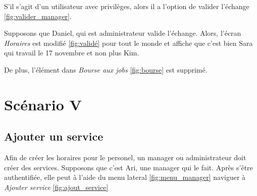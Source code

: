 S'il s'agit d'un utilisateur avec privilèges, alors il a l'option de valider l'échange \ref{fig:valider_manager}. 

Supposons que Daniel, qui est administrateur valide l'échange. Alors, l'écran \textit{Horaires} est modifié \ref{fig:validé}
pour tout le monde et affiche que c'est bien Sara qui travail le 17 novembre et non plus Kim. 

De plus, l'élément dans \textit{Bourse aux jobs} \ref{fig:bourse} est supprimé.

\section[Ajouter un service - Scénario V]{Scénario V}
    \subsection*{Ajouter un service}
    Afin de créer les horaires pour le personel, un manager ou administrateur doit créer des services. Supposons
    que c'est Ari, une manager qui le fait. Après s'être authentifiée, elle peut à l'aide du menu lateral \ref{fig:menu_manager} naviguer
    à \textit{Ajouter service} \ref{fig:ajout_service}

